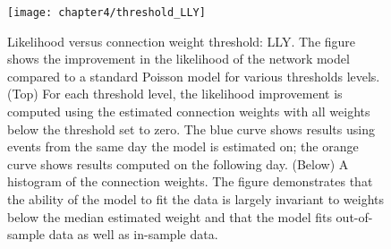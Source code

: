 
			\begin{figure}[p]
				\small
				\linespread{1}
				\centering
				\captionsetup{labelsep=colon, font=footnotesize, justification=centerfirst, width=\linewidth}
				\texttt{[image: chapter4/threshold\_LLY]}
				\captionsetup{skip=-20pt, position=below, font=footnotesize, justification=justified, width=\linewidth}
				\caption[Likelihood versus connection weight threshold: LLY]{Likelihood versus connection weight threshold: LLY. The figure shows the improvement in the likelihood of the network model compared to a standard Poisson model for various thresholds levels. (Top) For each threshold level, the likelihood improvement is computed using the estimated connection weights with all weights below the threshold set to zero. The blue curve shows results using events from the same day the model is estimated on; the orange curve shows results computed on the following day. (Below) A histogram of the connection weights. The figure demonstrates that the ability of the model to fit the data is largely invariant to weights below the median estimated weight and that the model fits out-of-sample data as well as in-sample data.}
				\label{fig:threshold_LLY}
			\end{figure}

